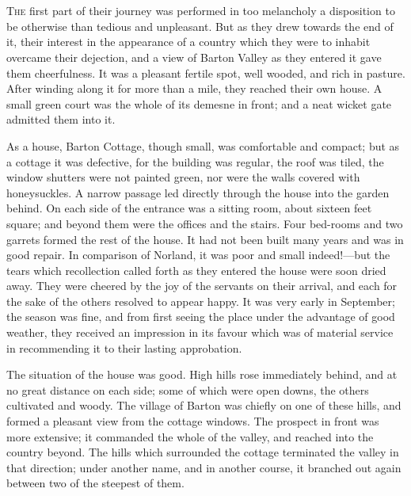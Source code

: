 \chapter[Chapter \thechapter]{}
\lettrine[lraise=0.3]{T}{he} first part of their journey was performed in too melancholy a disposition to be otherwise than tedious and unpleasant. But as they drew towards the end of it, their interest in the appearance of a country which they were to inhabit overcame their dejection, and a view of Barton Valley as they entered it gave them cheerfulness. It was a pleasant fertile spot, well wooded, and rich in pasture. After winding along it for more than a mile, they reached their own house. A small green court was the whole of its demesne in front; and a neat wicket gate admitted them into it.

As a house, Barton Cottage, though small, was comfortable and compact; but as a cottage it was defective, for the building was regular, the roof was tiled, the window shutters were not painted green, nor were the walls covered with honeysuckles. A narrow passage led directly through the house into the garden behind. On each side of the entrance was a sitting room, about sixteen feet square; and beyond them were the offices and the stairs. Four bed-rooms and two garrets formed the rest of the house. It had not been built many years and was in good repair. In comparison of Norland, it was poor and small indeed!—but the tears which recollection called forth as they entered the house were soon dried away. They were cheered by the joy of the servants on their arrival, and each for the sake of the others resolved to appear happy. It was very early in September; the season was fine, and from first seeing the place under the advantage of good weather, they received an impression in its favour which was of material service in recommending it to their lasting approbation.

The situation of the house was good. High hills rose immediately behind, and at no great distance on each side; some of which were open downs, the others cultivated and woody. The village of Barton was chiefly on one of these hills, and formed a pleasant view from the cottage windows. The prospect in front was more extensive; it commanded the whole of the valley, and reached into the country beyond. The hills which surrounded the cottage terminated the valley in that direction; under another name, and in another course, it branched out again between two of the steepest of them.

